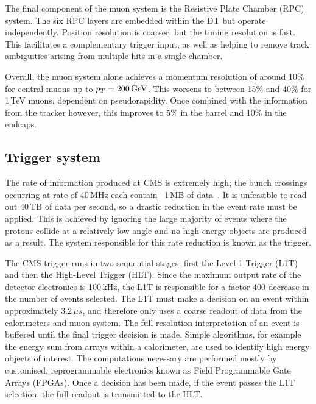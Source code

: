 The final component of the muon system is the Resistive Plate Chamber (RPC) system.
The six RPC layers are embedded within the DT but operate independently.
Position resolution is coarser, but the timing resolution is fast.
This facilitates a complementary trigger input, as well as helping to remove track ambiguities arising from multiple hits in a single chamber. %

Overall, the muon system alone achieves a momentum resolution of around 10\% for central muons up to $p_T=200\,\textrm{GeV}$.
This worsens to between 15\% and 40\% for 1\,TeV muons, dependent on pseudorapidity.
Once combined with the information from the tracker however, this improves to 5\% in the barrel and 10\% in the endcaps.

\subsection{Trigger system}

The rate of information produced at CMS is extremely high; the bunch crossings occurring at rate of 40\,MHz each contain ~1\,MB of data~\cite{CMStrigger}.
It is unfeasible to read out 40\,TB of data per second, so a drastic reduction in the event rate must be applied.
This is achieved by ignoring the large majority of events where the protons collide at a relatively low angle and no high energy objects are produced as a result.
The system responsible for this rate reduction is known as the trigger.

The CMS trigger runs in two sequential stages: first the Level-1 Trigger (L1T) and then the High-Level Trigger (HLT).
Since the maximum output rate of the detector electronics is 100\,kHz, the L1T is responsible for a factor 400 decrease in the number of events selected.
The L1T must make a decision on an event within approximately $3.2\,\mu s$, and therefore only uses a coarse readout of data from the calorimeters and muon system.
The full resolution interpretation of an event is buffered until the final trigger decision is made. %
Simple algorithms, for example the energy sum from arrays within a calorimeter, are used to identify high energy objects of interest.
The computations necessary are performed mostly by customised, reprogrammable electronics known as Field Programmable Gate Arrays (FPGAs).
Once a decision has been made, if the event passes the L1T selection, the full readout is transmitted to the HLT.

